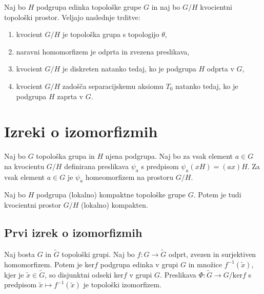 \documentclass[mat1]{fmfdelo}
\begin{document}
\begin{izrek}\label{izr:kvocpovzetek}
Naj bo $H$ podgrupa edinka topološke grupe $G$ in naj bo $G/H$ kvocientni topološki prostor. Veljajo naslednje trditve:
\begin{enumerate}
\item kvocient $G/H$ je topološka grupa s topologijo $\theta$,
\item naravni homomorfizem je odprta in zvezena preslikava,
\item kvocient $G/H$ je diskreten natanko tedaj, ko je podgrupa $H$ odprta v $G$,
\item kvocient $G/H$ zadošča separacijskemu aksiomu $T_0$ natanko tedaj, ko je podgrupa $H$ zaprta v $G$.
\end{enumerate}
\end{izrek}

\section{Izreki o izomorfizmih}

\begin{trditev}\label{trd:homogenkvoc}
	Naj bo $G$ topološka grupa in $H$ njena podgrupa. Naj bo za vsak element $a \in G$ na kvocientu $G/H$ definirana preslikava $\psi_a$ s predpisom $\psi_a(xH) = (ax)H$.
	Za vsak element $a \in G$ je $\psi_a$ homeomorfizem na prostoru $G/H$.
\end{trditev}

\begin{trditev}\label{trd:kvockompakt}
	Naj bo $H$ podgrupa (lokalno) kompaktne topološke grupe $G$. Potem je tudi kvocientni prostor $G/H$ (lokalno) kompakten.
\end{trditev}

\subsection{Prvi izrek o izomorfizmih}
\begin{izrek}\label{izr:prvitopizrek}
Naj bosta $G$ in $\widetilde{G}$ topološki grupi. Naj bo $f: G \to \widetilde{G}$ odprt, zvezen in surjektiven homomorfizem. Potem je ker$f$ podgrupa edinka v grupi $G$ in množice $f^{-1}(\tilde{x})$, kjer je $\tilde{x} \in \widetilde{G}$, so disjunktni odseki ker$f$ v grupi $G$. Preslikava $\Phi:\widetilde{G} \to G/\text{ker}f$ s predpisom $\tilde{x} \mapsto f^{-1}(\tilde{x})$ je topološki izomorfizem.
\end{izrek}
\end{document}
